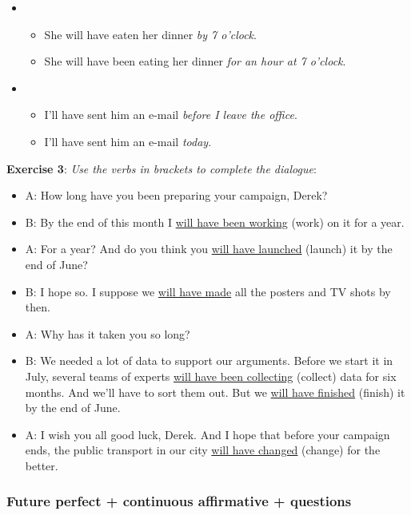 \begin{itemize}
\item
\begin{itemize}
\item She will have eaten her dinner \textit{by 7 o'clock}.
\item She will have been eating her dinner \textit{for an hour at 7 o'clock}.
\end{itemize}

\item
\begin{itemize}
\item I'll have sent him an e-mail \textit{before I leave the office}.
\item I'll have sent him an e-mail \textit{today}.
\end{itemize}

\end{itemize}

\textbf{Exercise 3}: \textit{Use the verbs in brackets to complete the dialogue}:

\begin{itemize}

\item A: How long have you been preparing your campaign, Derek?
\item B: By the end of this month I \underline{will have been working} (work) on it for a year.
\item A: For a year? And do you think you \underline{will have launched} (launch) it by the end of June?
\item B: I hope so. I suppose we \underline{will have made} all the posters and TV shots by then.
\item A: Why has it taken you so long?
\item B: We needed a lot of data to support our arguments. Before we start it in July, several teams of experts \underline{will have been collecting} (collect) data for six months. And we'll have to sort them  out. But we \underline{will have finished} (finish) it by the end of June.
\item A: I wish you all good luck, Derek. And I hope that before your campaign ends, the public transport in our city \underline{will have changed} (change) for the better. 

\end{itemize}

\subsubsection{Future perfect + continuous affirmative + questions}

